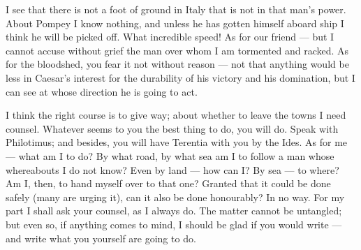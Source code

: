 

 I see that there is not a foot of ground in Italy that is not in that man's power. About Pompey I know nothing, and unless he has gotten himself aboard ship I think he will be picked off. What incredible speed! As for our friend --- but I cannot accuse without grief the man over whom I am tormented and racked. As for the bloodshed, you fear it not without reason --- not that anything would be less in Caesar's interest for the durability of his victory and his domination, but I can see at whose direction he is going to act.

 I think the right course is to give way; about whether to leave the towns I need counsel. Whatever seems to you the best thing to do, you will do. Speak with Philotimus; and besides, you will have Terentia with you by the Ides. As for me --- what am I to do? By what road, by what sea am I to follow a man whose whereabouts I do not know? Even by land --- how can I? By sea --- to where? Am I, then, to hand myself over to that one? Granted that it could be done safely (many are urging it), can it also be done honourably? In no way. For my part I shall ask your counsel, as I always do. The matter cannot be untangled; but even so, if anything comes to mind, I should be glad if you would write --- and write what you yourself are going to do.
